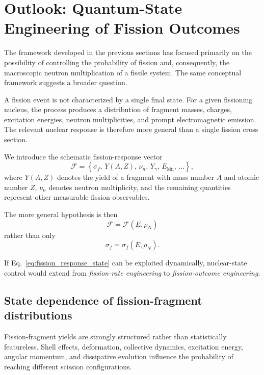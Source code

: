 \section{Outlook: Quantum-State Engineering of Fission Outcomes}
\label{sec:outlook}

The framework developed in the previous sections has focused primarily on the possibility of controlling the probability of fission and, consequently, the macroscopic neutron multiplication of a fissile system. The same conceptual framework suggests a broader question.

A fission event is not characterized by a single final state. For a given fissioning nucleus, the process produces a distribution of fragment masses, charges, excitation energies, neutron multiplicities, and prompt electromagnetic emission. The relevant nuclear response is therefore more general than a single fission cross section.

We introduce the schematic fission-response vector
\begin{equation}
\mathcal{F}
=
\left\{
\sigma_f,\,
Y(A,Z),\,
\nu_n,\,
Y_\gamma,\,
E_{\mathrm{kin}},\,
\ldots
\right\},
\label{eq:fission_response_vector}
\end{equation}
where $Y(A,Z)$ denotes the yield of a fragment with mass number $A$ and atomic number $Z$, $\nu_n$ denotes neutron multiplicity, and the remaining quantities represent other measurable fission observables.

The more general hypothesis is then
\begin{equation}
\boxed{
\mathcal{F}
=
\mathcal{F}(E,\rho_N)
}
\label{eq:fission_response_state}
\end{equation}
rather than only
\begin{equation}
\sigma_f
=
\sigma_f(E,\rho_N).
\end{equation}

If Eq.~\eqref{eq:fission_response_state} can be exploited dynamically, nuclear-state control would extend from \emph{fission-rate engineering} to \emph{fission-outcome engineering}.

\subsection{State dependence of fission-fragment distributions}

Fission-fragment yields are strongly structured rather than statistically featureless. Shell effects, deformation, collective dynamics, excitation energy, angular momentum, and dissipative evolution influence the probability of reaching different scission configurations.

